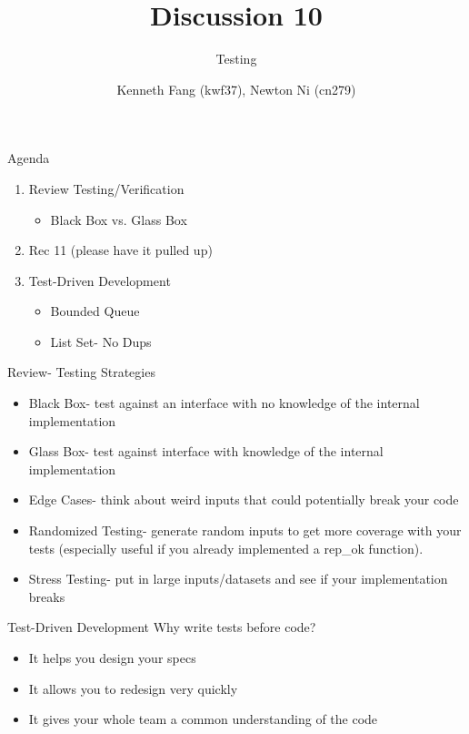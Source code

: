 \documentclass{beamer}
\title{Discussion 10}
\subtitle{Testing}
\author{Kenneth Fang (kwf37), Newton Ni (cn279)}
\begin{document}
    \begin{frame}
        \titlepage{}
    \end{frame}
    
    \begin{frame}{Agenda}
    \begin{enumerate}
        \item Review Testing/Verification
            \begin{itemize}
                \item Black Box vs. Glass Box
            \end{itemize}
        \item Rec 11 (please have it pulled up)
        \item Test-Driven Development
            \begin{itemize}
                \item Bounded Queue
                \item List Set- No Dups
            \end{itemize}
    \end{enumerate}
    \end{frame}
    
    \begin{frame}{Review- Testing Strategies}
    \begin{itemize}
        \item Black Box- test against an interface with no knowledge of the internal implementation \pause
        \item Glass Box- test against interface with knowledge of the internal implementation \pause
        \item Edge Cases- think about weird inputs that could potentially break your code \pause
        \item Randomized Testing- generate random inputs to get more coverage with your tests (especially useful if you already implemented a rep\_ok function). \pause
        \item Stress Testing- put in large inputs/datasets and see if your implementation breaks
    \end{itemize}
    \end{frame}
    
    \begin{frame}{Test-Driven Development}
    Why write tests before code? \pause
    \begin{itemize}
        \item It helps you design your specs \pause
        \item It allows you to redesign very quickly \pause
        \item It gives your whole team a common understanding of the code
    \end{itemize}
    \end{frame}
    
\end{document}
